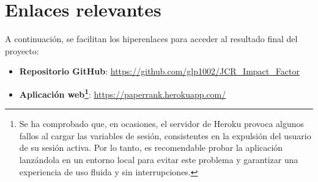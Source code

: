 \section{Enlaces relevantes}

A continuación, se facilitan los hiperenlaces para acceder al resultado final del proyecto:

\begin{itemize}
    \item \textbf{Repositorio GitHub}: \url{https://github.com/glp1002/JCR_Impact_Factor}
    
    \item \textbf{Aplicación web\footnote{Se ha comprobado que, en ocasiones, el servidor de Heroku provoca algunos fallos al cargar las variables de sesión, consistentes en la expulsión del usuario de su sesión activa. Por lo tanto, es recomendable probar la aplicación lanzándola en un entorno local para evitar este problema y garantizar una experiencia de uso fluida y sin interrupciones.}}: \url{https://paperrank.herokuapp.com/}
    
\end{itemize}